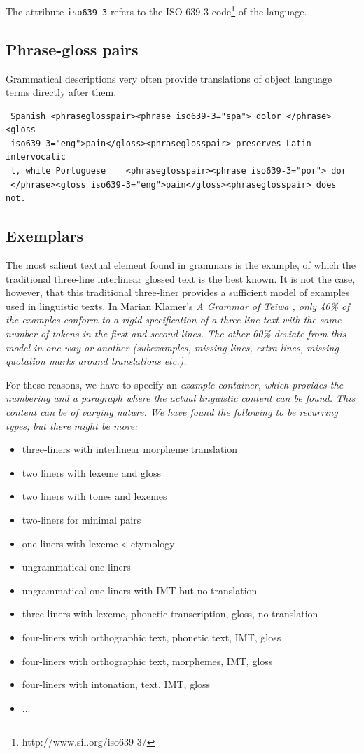 \documentclass[a4paper,10pt]{article}
\begin{document}
The attribute \texttt{iso639-3} refers to the ISO 639-3 code\footnote{http://www.sil.org/iso639-3/} of the language.

\subsection{Phrase-gloss pairs}
Grammatical descriptions very often provide translations of object language terms directly after them.

\begin{verbatim}
 Spanish <phraseglosspair><phrase iso639-3="spa"> dolor </phrase><gloss
 iso639-3="eng">pain</gloss><phraseglosspair> preserves Latin intervocalic
 l, while Portuguese    <phraseglosspair><phrase iso639-3="por"> dor 
 </phrase><gloss iso639-3="eng">pain</gloss><phraseglosspair> does not.
\end{verbatim}


\subsection{Exemplars}
The most salient textual element found in grammars is the example, of which the traditional three-line interlinear glossed text is the best known. It is not the case, however, that this traditional three-liner provides a sufficient model of examples used in linguistic texts. In Marian Klamer's \em A Grammar of Teiwa \em \citep{g:Klamer:Teiwa}, only 40\% of the examples conform to a rigid specification of a three line text with the same number of tokens in the first and second lines. The other 60\% deviate from this model in one way or another (subexamples, missing lines, extra lines, missing quotation marks around translations etc.).

For these reasons, we have to specify an \em example container\em, which provides the numbering and a paragraph where the actual linguistic content can be found. This content can be of varying nature. We have found the following to be recurring types, but there might be more:

\begin{itemize}
 \item three-liners with interlinear morpheme translation
 \item two liners with lexeme and gloss
 \item two liners with tones and lexemes
 \item two-liners for minimal pairs
 \item one liners with lexeme$<$etymology
 \item ungrammatical one-liners
 \item ungrammatical one-liners with IMT but no translation
 \item three liners with lexeme, phonetic transcription, gloss, no translation
 \item four-liners with orthographic text, phonetic text, IMT, gloss
 \item four-liners with orthographic text, morphemes, IMT, gloss
 \item four-liners with intonation, text, IMT, gloss
 \item ...
\end{itemize}
\end{document}
